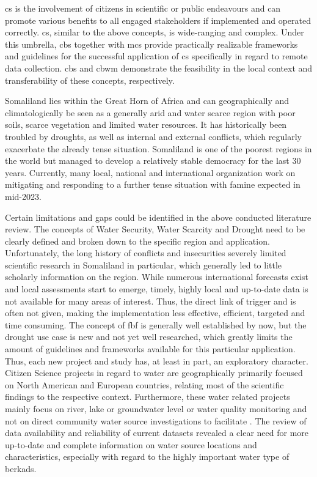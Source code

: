 \acrfull{cs} is the involvement of citizens in scientific or public endeavours and can promote various benefits to all engaged stakeholders if implemented and operated correctly. \acrlong{cs}, similar to the above concepts, is wide-ranging and complex. Under this umbrella, \acrfull{cbs} together with \acrlong{mcs} provide practically realizable frameworks and guidelines for the successful application of \acrshort{cs} specifically in regard to remote data collection. \acrshort{cbs} and \acrfull{cbwm} demonstrate the feasibility in the local context and transferability of these concepts, respectively.

Somaliland lies within the Great Horn of Africa and can geographically and climatologically be seen as a generally arid and water scarce region with poor soils, scarce vegetation and limited water resources. It has historically been troubled by droughts, as well as internal and external conflicts, which regularly exacerbate the already tense situation. Somaliland is one of the poorest regions in the world but managed to develop a relatively stable democracy for the last 30 years. Currently, many local, national and international organization work on mitigating and responding to a further tense situation with famine expected in mid-2023. 

Certain limitations and gaps could be identified in the above conducted literature review. The concepts of Water Security, Water Scarcity and Drought need to be clearly defined and broken down to the specific region and application. Unfortunately, the long history of conflicts and insecurities severely limited scientific research in Somaliland in particular, which generally led to little scholarly information on the region.\newline
While numerous international forecasts exist and local assessments start to emerge, timely, highly local and up-to-date data is not available for many areas of interest. Thus, the direct link of trigger and  is often not given, making the implementation less effective, efficient, targeted and time consuming.\newline
The concept of \acrshort{fbf} is generally well established by now, but the drought use case is new and not yet well researched, which greatly limits the amount of guidelines and frameworks available for this particular application. Thus, each new project and study has, at least in part, an exploratory character.\newline
Citizen Science projects in regard to water are geographically primarily focused on North American and European countries, relating most of the scientific findings to the respective context. Furthermore, these water related projects mainly focus on river, lake or groundwater level or water quality monitoring and not on direct community water source investigations to facilitate . The review of data availability and reliability of current datasets revealed a clear need for more up-to-date and complete information on water source locations and characteristics, especially with regard to the highly important water type of berkads. 
